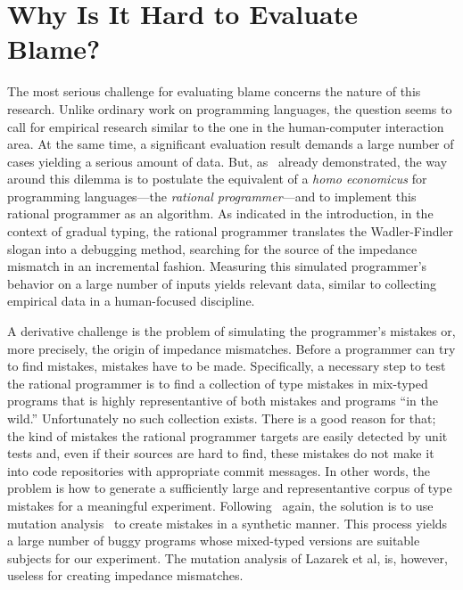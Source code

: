 
\section{Why Is It Hard to Evaluate Blame?}

The most serious challenge for evaluating blame concerns 
the nature of this research. Unlike ordinary
work on programming languages, the question seems to call for empirical research
similar to the one in the human-computer interaction area. At the same time, a
significant evaluation result demands a large number of cases yielding a serious
amount of data. But, as~\citet{lksfd-popl-2020} already demonstrated, the way
around this dilemma is to postulate the equivalent of a {\it homo economicus\/}
for programming languages---the {\em rational programmer\/}---and to implement
this rational programmer as an algorithm.  As indicated in the introduction, in
the context of gradual typing, the rational programmer translates the
Wadler-Findler slogan into a debugging method, searching for the source of the
impedance mismatch in an incremental fashion. Measuring this simulated
programmer's behavior on a large number of inputs yields relevant 
data, similar to collecting empirical data in a human-focused discipline. 

A derivative challenge is the problem of simulating the programmer's
mistakes or, more precisely, the origin of impedance mismatches. Before a
programmer can try to find mistakes, mistakes have to be made.
Specifically, a necessary step to test the rational programmer is to find
a collection of  type mistakes in  mix-typed programs that is highly
representantive of both mistakes and programs ``in the wild.''
Unfortunately no such collection exists.  There is a good reason for that;
the kind of mistakes the rational programmer targets are easily detected
by unit tests and, even if their sources are hard to find, these mistakes do not make it
into code repositories with appropriate commit messages.  In other words, the problem is how to generate a
sufficiently large and representantive corpus of type mistakes for a meaningful
experiment.  Following~\citet{lksfd-popl-2020} again, the solution is to
use mutation analysis~\cite{lipton1971fault, demillo1978hints,
jia2011analysis} to create mistakes in a synthetic manner. This process
yields a large number of buggy programs whose mixed-typed versions are
suitable subjects for our experiment.  The mutation analysis of Lazarek et
al, is, however, useless for creating impedance mismatches.

